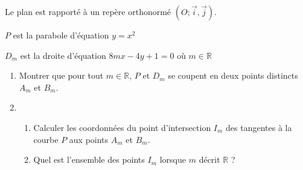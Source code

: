 
%
Le plan est rapporté à un repère orthonormé $\left(O; \vec{i}, \vec{j}\right)$.
\par
$P$ est la parabole d'équation $y=x^{2}$
\par
$D_{m}$ est la droite d'équation $8mx-4y+1=0$ où $m\in \mathbb{R}$
\begin{enumerate}
     \item
     Montrer que pour tout $m\in \mathbb{R}$, $P$ et $D_{m}$ se coupent en deux points distincts $A_{m}$ et $B_{m}$.
     \item
     \begin{enumerate}[label=\alph*.]
          \item
          Calculer les coordonnées du point d'intersection $I_{m}$ des tangentes à la courbe $P$ aux points $A_{m}$ et $B_{m}$.
          \item
          Quel est l'ensemble des points $I_{m}$ lorsque $m$ décrit $\mathbb{R}$ ?
     \end{enumerate}
\end{enumerate}

